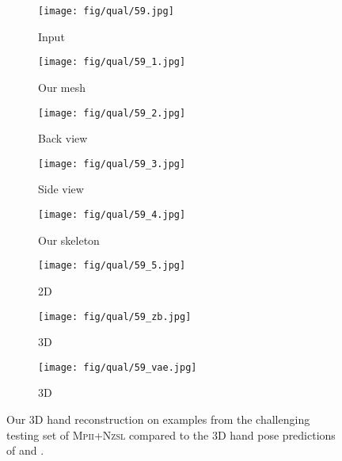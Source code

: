 \documentclass[10pt,twocolumn,letterpaper]{article}
\newcommand{\sze}{0.13}
\newcommand{\szle}{0.08}
\begin{document}
\begin{figure*}
\begin{subfigure}[c]{\sze\linewidth}
\texttt{[image: fig/qual/59.jpg]}
\caption{Input}
\end{subfigure}
\begin{subfigure}[c]{\sze\linewidth}
\texttt{[image: fig/qual/59\_1.jpg]}
\caption{Our mesh}
\end{subfigure}
\begin{subfigure}[c]{\sze\linewidth}
\texttt{[image: fig/qual/59\_2.jpg]}
\caption{Back view}
\end{subfigure}
\begin{subfigure}[c]{\sze\linewidth}
\texttt{[image: fig/qual/59\_3.jpg]}
\caption{Side view}
\end{subfigure}
\begin{subfigure}[c]{\sze\linewidth}
\texttt{[image: fig/qual/59\_4.jpg]}
\caption{Our skeleton}
\end{subfigure}
\hspace{3pt}
\begin{subfigure}[c]{\sze\linewidth}
\texttt{[image: fig/qual/59\_5.jpg]}
\caption{\cite{zimmermann2017learning}2D}
\end{subfigure}
\begin{subfigure}[c]{\szle\linewidth}
\texttt{[image: fig/qual/59\_zb.jpg]}
\caption{\cite{zimmermann2017learning}3D}
\end{subfigure}
\hspace{3pt}
\begin{subfigure}[c]{\szle\linewidth}
\texttt{[image: fig/qual/59\_vae.jpg]}
\caption{\cite{spurr2018cross}3D}
\end{subfigure}

\caption*{Our 3D hand reconstruction on examples from the challenging testing set of \textsc{Mpii+Nzsl} compared to the 3D hand pose predictions of \cite{zimmermann2017learning} and \cite{spurr2018cross}.}

\end{figure*}
\end{document}
